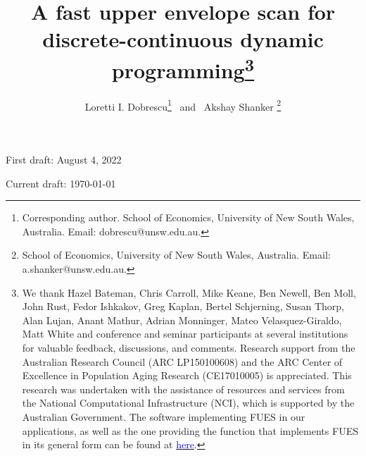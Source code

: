 \documentclass[12pt]{article}
\begin{document}

\title{\vspace{-1cm} A fast upper envelope scan for \\ discrete-continuous dynamic programming\thanks{\footnotesize{}{}{}
We thank Hazel Bateman, Chris Carroll, Mike Keane, Ben Newell, Ben Moll, John Rust, Fedor Ishkakov, Greg Kaplan, Bertel Schjerning, Susan Thorp, Alan Lujan, Anant Mathur, Adrian Monninger, Mateo Velasquez-Giraldo, Matt White and conference and seminar participants at several institutions for valuable feedback, discussions, and comments. Research support from the Australian Research Council (ARC LP150100608) and the ARC Center of Excellence in Population Aging Research (CE17010005) is appreciated. This research was undertaken with the assistance of resources and services from the National Computational Infrastructure (NCI), which is supported by the Australian Government. The software implementing FUES in our applications, as well as the one providing the function that implements FUES in its general form can be found at \href{http://github.com/akshayshanker/FUES_EGM}{\textcolor{blue}{here}}.}}
\author{Loretti I. Dobrescu\thanks{{\footnotesize{}{}{}Corresponding author. School of Economics, University of New South Wales, Australia. Email: dobrescu@unsw.edu.au.}} \, and \ Akshay Shanker \thanks{{School of Economics, University of New South Wales, Australia. Email: a.shanker@unsw.edu.au.}}
}
\date{} %
%
\maketitle

\begin{center}
First draft: August 4, 2022 \par
Current draft: \today
\vspace{3em}
\end{center}
\end{document}
